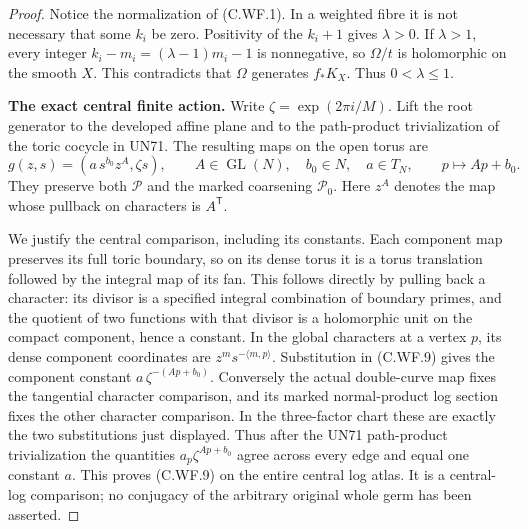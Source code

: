 \begin{proof}
Notice the normalization of (C.WF.1).  In a weighted fibre it
is not necessary that some \(k_i\) be zero.  Positivity of
the \(k_i+1\) gives \(\lambda>0\).  If \(\lambda>1\), every
integer \(k_i-m_i=(\lambda-1)m_i-1\) is nonnegative, so
\(\Omega/t\) is holomorphic on the smooth \(X\).  This
contradicts that \(\Omega\) generates \(f_*K_X\).
Thus \(0<\lambda\le1\).

\par\medskip\noindent\textbf{The exact central finite action.}
Write \(\zeta=\exp(2\pi i/M)\).  Lift the root generator
to the developed affine plane and to the path-product
trivialization of the toric cocycle in UN71.  The resulting
maps on the open torus are
\[
 g(z,s)=(a\,s^{b_0}z^A,\zeta s),\qquad
 A\in\operatorname{GL}(N),\quad b_0\in N,\quad a\in T_N,
 \qquad p\longmapsto Ap+b_0.
\tag{C.WF.9}
\]
They preserve both \(\mathscr P\) and the marked coarsening
\(\mathscr P_0\).  Here \(z^A\) denotes the map whose
pullback on characters is \(A^{\mathsf T}\).

We justify the central comparison, including its constants.
Each component map preserves its full toric boundary, so on
its dense torus it is a torus translation followed by the
integral map of its fan.  This follows directly by pulling
back a character: its divisor is a specified integral
combination of boundary primes, and the quotient of two
functions with that divisor is a holomorphic unit on the
compact component, hence a constant.  In the global
characters at a vertex \(p\), its dense component coordinates
are \(z^m s^{-\langle m,p\rangle}\).  Substitution in
(C.WF.9) gives the component constant
\(a\,\zeta^{-(Ap+b_0)}\).
Conversely the actual double-curve map fixes the tangential
character comparison, and its marked normal-product log
section fixes the other character comparison.  In the
three-factor chart these are exactly the two substitutions
just displayed.  Thus after the UN71 path-product
trivialization the quantities
\(a_p\zeta^{Ap+b_0}\) agree across every edge and equal one
constant \(a\).  This proves (C.WF.9) on the entire central
log atlas.  It is a central-log comparison; no conjugacy of
the arbitrary original whole germ has been asserted.


\end{proof}
